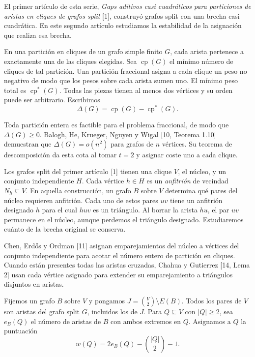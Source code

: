 \documentclass[spanish,11pt,a4paper]{article}
\begin{document}
El primer artículo de esta serie, \emph{Gaps aditivos casi cuadráticos para particiones de aristas en cliques de grafos split} {[}1{]}, construyó grafos split con una brecha casi cuadrática. En este segundo artículo estudiamos la estabilidad de la asignación que realiza esa brecha.

En una partición en cliques de un grafo simple finito \(G\), cada arista pertenece a exactamente una de las cliques elegidas. Sea \(\operatorname{cp}(G)\) el mínimo número de cliques de tal partición. Una partición fraccional asigna a cada clique un peso no negativo de modo que los pesos sobre cada arista sumen uno. El mínimo peso total es \(\operatorname{cp}^{\ast}(G)\). Todas las piezas tienen al menos dos vértices y su orden puede ser arbitrario. Escribimos
\[
\Delta(G)=\operatorname{cp}(G)-\operatorname{cp}^{\ast}(G).
\]

Toda partición entera es factible para el problema fraccional, de modo que \(\Delta(G)\ge0\). Balogh, He, Krueger, Nguyen y Wigal {[}10, Teorema 1.10{]} demuestran que \(\Delta(G)=o(n^2)\) para grafos de \(n\) vértices. Su teorema de descomposición da esta cota al tomar \(t=2\) y asignar coste uno a cada clique.

Los grafos split del primer artículo {[}1{]} tienen una clique \(V\), el núcleo, y un conjunto independiente \(H\). Cada vértice \(h\in H\) es un \emph{anfitrión} de vecindad \(N_h\subseteq V\). En aquella construcción, un grafo \(B\) sobre \(V\) determina qué pares del núcleo requieren anfitrión. Cada uno de estos pares \(uv\) tiene un anfitrión designado \(h\) para el cual \(huv\) es un triángulo. Al borrar la arista \(hu\), el par \(uv\) permanece en el núcleo, aunque perdemos el triángulo designado. Estudiaremos cuánto de la brecha original se conserva.

Chen, Erdős y Ordman {[}11{]} asignan emparejamientos del núcleo a vértices del conjunto independiente para acotar el número entero de partición en cliques. Cuando están presentes todas las aristas cruzadas, Chahua y Gutierrez {[}14, Lema 2{]} usan cada vértice asignado para extender su emparejamiento a triángulos disjuntos en aristas.

Fijemos un grafo \(B\) sobre \(V\) y pongamos \(J=\binom{V}{2}\setminus E(B)\). Todos los pares de \(V\) son aristas del grafo split \(G\), incluidos los de \(J\). Para \(Q\subseteq V\) con \(|Q|\ge2\), sea \(e_B(Q)\) el número de aristas de \(B\) con ambos extremos en \(Q\). Asignamos a \(Q\) la puntuación
\[
w(Q)=2e_B(Q)-\binom{|Q|}{2}-1.
\]
\end{document}
